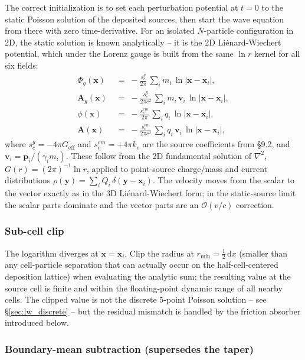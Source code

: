 \documentclass[11pt,a4paper]{article}
\newcommand{\vv}[1]{\mathbf{#1}}
\newcommand{\Phig}{\Phi_g}
\newcommand{\Ag}{\vv{A}_g}
\newcommand{\order}[1]{\mathcal{O}(#1)}
\newcommand{\dd}{\mathrm{d}}
\newcommand{\half}{\tfrac{1}{2}}
\begin{document}
The correct initialization is to set each perturbation potential at
$t=0$ to the static Poisson solution of the deposited sources, then
start the wave equation from there with zero time-derivative.  For an
isolated $N$-particle configuration in 2D, the static solution is
known analytically -- it is the 2D Liénard-Wiechert potential, which
under the Lorenz gauge is built from the same $\ln r$ kernel for all
six fields:
\begin{align}
  \Phig(\vv{x})  &\;=\; -\frac{s_c^g}{2\pi}\,\sum_i m_i\,\ln|\vv{x}-\vv{x}_i|,
    \label{eq:phig_lw} \\
  \Ag(\vv{x})  &\;=\; -\frac{s_c^g}{2\pi c^2}\,\sum_i m_i\,\vv{v}_i\,\ln|\vv{x}-\vv{x}_i|,
    \label{eq:Ag_lw} \\
  \phi(\vv{x})  &\;=\; -\frac{s_c^{em}}{2\pi}\,\sum_i q_i\,\ln|\vv{x}-\vv{x}_i|,
    \label{eq:phi_lw} \\
  \vv{A}(\vv{x})  &\;=\; -\frac{s_c^{em}}{2\pi c^2}\,\sum_i q_i\,\vv{v}_i\,\ln|\vv{x}-\vv{x}_i|,
    \label{eq:A_lw}
\end{align}
where $s_c^g = -4\pi G_{\text{eff}}$ and $s_c^{em} = +4\pi k_e$ are
the source coefficients from \S 9.2, and $\vv{v}_i = \vv{p}_i/(\gamma_i
m_i)$.  These follow from the 2D fundamental solution of $\nabla^2$,
$G(r) = (2\pi)^{-1}\ln r$, applied to point-source charge/mass and
current distributions $\rho(\vv{y}) = \sum_i Q_i\,\delta(\vv{y}-\vv{x}_i)$.
The velocity moves from the scalar to the vector exactly as in the
3D Liénard-Wiechert form; in the static-source limit the scalar
parts dominate and the vector parts are an $\order{v/c}$ correction.

\subsubsection*{Sub-cell clip}

The logarithm diverges at $\vv{x} = \vv{x}_i$.  Clip the radius at
$r_{\min} = \half\,\dd x$ (smaller than any cell-particle separation
that can actually occur on the half-cell-centered deposition lattice)
when evaluating the analytic sum; the resulting value at the source
cell is finite and within the floating-point dynamic range of all
nearby cells.  The clipped value is not the discrete 5-point Poisson
solution -- see \S\ref{sec:lw_discrete} -- but the residual mismatch is
handled by the friction absorber introduced below.

\subsubsection*{Boundary-mean subtraction (supersedes the taper)}
\end{document}
